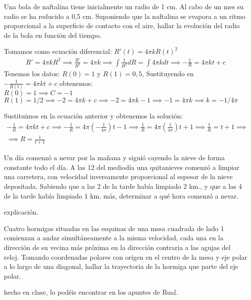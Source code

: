 \documentclass[nochap]{apuntes}
\begin{document}
\newpage
\begin{problem}[16]
Una bola de naftalina tiene inicialmente un radio de 1 cm. Al cabo de un mes su radio se ha reducido a 0,5 cm. Suponiendo que la naftalina se evapora a un ritmo proporcional a la superficie de contacto con el aire, hallar la evolución del radio de la bola en función del tiempo.
\solution
\begin{expla}

\end{expla}
Tomamos como ecuación diferencial: $R'(t)=4\pi k{R(t)}^2$
\begin{gather*}
R'=4\pi kR^2 \implies \frac{R'}{R^2}=4\pi k \implies
\int \frac{1}{R^2}dR=\int 4\pi kdt \implies -\frac{1}{R}=4\pi kt+c
\end{gather*}
Tenemos los datos: $R(0)=1$ y $R(1)=0,5$, Sustituyendo en $-\frac{1}{R(t)}=4\pi kt+c$ obtenemos:\\
$R(0)=1 \implies C=-1$\\
$R(1)=1/2 \implies -2=4\pi k +c \implies -2=4\pi k -1  \implies -1=4\pi k  \implies k=-1/4\pi$

Sustituimos en la ecuación anterior y obtenemos la solución:
\begin{gather*}
-\frac{1}{R}=4\pi kt+c \implies -\frac{1}{R}=4\pi (-\frac{1}{4\pi})t-1 \implies  \frac{1}{R}=4\pi (\frac{1}{4\pi})t+1 \implies \frac{1}{R}=t+1 \implies \\ \implies R=\frac{1}{t+1}
\end{gather*} 




\end{problem}
\newpage
\begin{problem}[17]
Un día comenzó a nevar por la mañana y siguió cayendo la nieve de forma constante todo el día. A las 12 del mediodía una quitanieves comenzó a limpiar una carretera, con velocidad inversamente proporcional al espesor de la nieve depositada. Sabiendo que a las 2 de la tarde había limpiado 2 km., y que a las 4 de la tarde había limpiado 1 km. más, determinar a qué hora comenzó a nevar. 
\solution
\begin{expla}
explicación.
\end{expla}
\end{problem}
\newpage
\begin{problem}[18]
Cuatro hormigas situadas en las esquinas de una mesa cuadrada de lado 1 comienzan a andar simultáneamente a la misma velocidad, cada una en la dirección de su vecina más próxima en la dirección contraria a las agujas del reloj. Tomando coordenadas polares con origen en el centro de la mesa y eje polar a lo largo de una diagonal, hallar la trayectoria de la hormiga que parte del eje polar.
\solution
\begin{expla}
hecho en clase, lo podéis encontrar en los apuntes de Rual.
\end{expla}
\end{problem}
\end{document}
